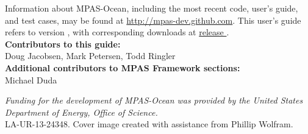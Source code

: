 Information about MPAS-Ocean, including the most recent code, user's guide, and test cases, may be found at \url{http://mpas-dev.github.com}.  This user's guide refers to version \version, with corresponding downloads at \href{http://mpas-dev.github.com/ocean/release_\version/release_\version.html}{release \version}. \\

\vspace{8pt}
\noindent
{\bf Contributors to this guide:}\\
Doug Jacobsen, Mark Petersen, Todd Ringler\\
{\bf Additional contributors to MPAS Framework sections:}\\
Michael Duda

\vspace{8pt}
\noindent
{\scriptsize
{\it Funding for the development of MPAS-Ocean was provided by the United States Department of Energy, Office of Science.} \\
LA-UR-13-24348. Cover image created with assistance from Phillip Wolfram.}




